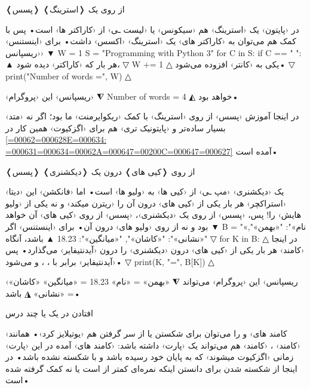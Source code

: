 \documentclass[openany, twocolumn]{book}
\begin{document}
\begin{InlinePrograms}
\begin{Program}
\caption{❬پسس❭ از روی یک ❬استرینگ❭\label{R49}}

در ‹پایتون› یک ‹استرینگ› هم ‹سیکونس› یا ‹لیست ـی› از ‹کاراکتر ها› است• پس با کمک  هم می‌توان به ‹کاراکتر های› یک ‹استرینگ› ‹اکسس› داشت• برای ‹اینستنس› ‹ریسپانس› 
▼
W = 1
S = "Programming with Python 3"
for C in S:
	if C == " ":
▲
 هر بار که ‹کاراکتر›  دیده شود، 
▽
		W += 1
△
 یکی به ‹کانتر›  افزوده می‌شود• 
▽
print("Number of words =", W) 
△

‹ریسپانس› این ‹پروگرام› 
⧨
Number of words = 4
◭
 خواهد بود•

در اینجا آموزش ‹پسس› از روی ‹استرینگ› با کمک  ‹ریکوایرمنت› ما بود؛ اگر نه ‹متد› بسیار ساده‌تر و ‹پایتونیک تری› هم برای ‹اگزکیوت› همین کار در \ref{=000628=00062E=000634: =000631=000634=00062A=000647=00200C=000647=000627} آمده است•
\end{Program}

\begin{Program}
\caption{❬پسس❭ از روی ❬کیی های❭ درون یک ❬دیکشنری❭\label{R50}}

یک ‹دیکشنری› ‹مپ ـی› از ‹کیی ها› به ‹ولیو ها› است• اما ‹فانکشن›  این ‹دیتا› ‹استراکچر› هر بار یکی از ‹کیی های› درون آن را ‹ریترن میکند› و نه یکی از ‹ولیو هایش› را! پس، ‹پسس› از روی یک ‹دیکشنری›، ‹پسس› از روی ‹کیی های› آن خواهد بود و نه از روی ‹ولیو های› درون آن• برای ‹اینستنس› اگر 
▼
B = {
		"«نام»": "«بهمن»",
		"«نشانی»": "«کاشان»",
		"«میانگین»": 18.23
	}
▲
 باشد، آنگاه 
▽
for K in B:
△
 در اینجا ‹کامند›  هر بار یکی از ‹کیی های› درون ‹دیکشنری›  را درون ‹آیدنتیفایر›  می‌گذارد• پس ‹آیدنتیفایر›  برابر با ، ، و  می‌شود• 
▽
	print(K, "=", B[K])
△

‹ریسپانس› این ‹پروگرام› می‌تواند 
⧩
«بهمن» = «نام»
18.23 = «میانگین»
«کاشان» = «نشانی»
◮
 باشد•
\end{Program}

\begin{Program}
\caption{افتادن در یک یا چند درس\label{R51}}

‹کامند های›  و  را می‌توان برای شکستن یا از سر گرفتن  هم ‹یوتیلایز کرد›• همانند ‹کامند› ، ‹کامند›  هم می‌تواند یک ‹پارت›  داشته باشد: ‹کامند های› آمده در این ‹پارت› زمانی ‹اگزکیوت میشوند› که  به پایان خود رسیده باشد و با  شکسته نشده باشد• در اینجا از شکسته شدن  برای دانستن اینکه نمره‌ای کمتر از  است یا نه کمک گرفته شده است•


\end{Program}
\end{InlinePrograms}
\end{document}
